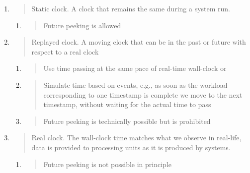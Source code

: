 \documentclass[11pt, reqno]{amsart}
\begin{document}
\begin{enumerate}
\def\labelenumi{\arabic{enumi})}
\item
  \begin{quote}
  Static clock. A clock that remains the same during a system run.
  \end{quote}

  \begin{enumerate}
  \def\labelenumii{\alph{enumii}.}
  \item
    \begin{quote}
    Future peeking is allowed
    \end{quote}
  \end{enumerate}
\item
  \begin{quote}
  Replayed clock. A moving clock that can be in the past or future with
  respect to a real clock
  \end{quote}

  \begin{enumerate}
  \def\labelenumii{\alph{enumii}.}
  \item
    \begin{quote}
    Use time passing at the same pace of real-time wall-clock or
    \end{quote}
  \item
    \begin{quote}
    Simulate time based on events, e.g., as soon as the workload
    corresponding to one timestamp is complete we move to the next
    timestamp, without waiting for the actual time to pass
    \end{quote}
  \item
    \begin{quote}
    Future peeking is technically possible but is prohibited
    \end{quote}
  \end{enumerate}
\item
  \begin{quote}
  Real clock. The wall-clock time matches what we observe in real-life,
  data is provided to processing units as it is produced by systems.
  \end{quote}

  \begin{enumerate}
  \def\labelenumii{\alph{enumii}.}
  \item
    \begin{quote}
    Future peeking is not possible in principle
    \end{quote}
  \end{enumerate}
\end{enumerate}
\end{document}

